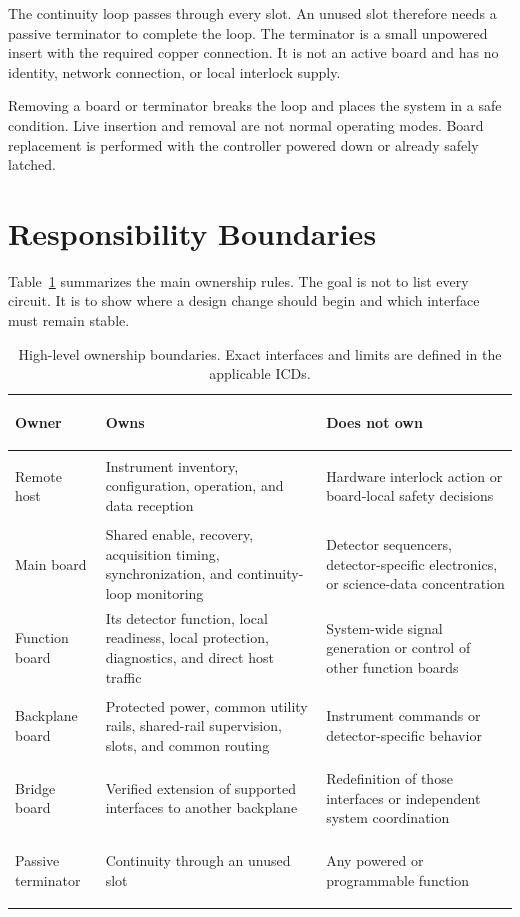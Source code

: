 The continuity loop passes through every slot. An unused slot therefore needs a passive terminator to complete the loop. The terminator is a small unpowered insert with the required copper connection. It is not an active board and has no identity, network connection, or local interlock supply.

Removing a board or terminator breaks the loop and places the system in a safe condition. Live insertion and removal are not normal operating modes. Board replacement is performed with the controller powered down or already safely latched.

\section{Responsibility Boundaries}

Table~\ref{tab:responsibility-boundaries} summarizes the main ownership rules. The goal is not to list every circuit. It is to show where a design change should begin and which interface must remain stable.

\begin{table}[htbp]
\centering
\small
\begin{tabularx}{\textwidth}{@{}>{\bfseries\raggedright\arraybackslash}p{}>{\raggedright\arraybackslash}p{}>{\raggedright\arraybackslash}X@{}}
\toprule
Owner & Owns & Does not own \\
\midrule
Remote host & Instrument inventory, configuration, operation, and data reception & Hardware interlock action or board-local safety decisions \\
Main board & Shared enable, recovery, acquisition timing, synchronization, and continuity-loop monitoring & Detector sequencers, detector-specific electronics, or science-data concentration \\
Function board & Its detector function, local readiness, local protection, diagnostics, and direct host traffic & System-wide signal generation or control of other function boards \\
Backplane board & Protected power, common utility rails, shared-rail supervision, slots, and common routing & Instrument commands or detector-specific behavior \\
Bridge board & Verified extension of supported interfaces to another backplane & Redefinition of those interfaces or independent system coordination \\
Passive terminator & Continuity through an unused slot & Any powered or programmable function \\
\bottomrule
\end{tabularx}
\caption{High-level ownership boundaries. Exact interfaces and limits are defined in the applicable ICDs.}
\label{tab:responsibility-boundaries}
\end{table}

